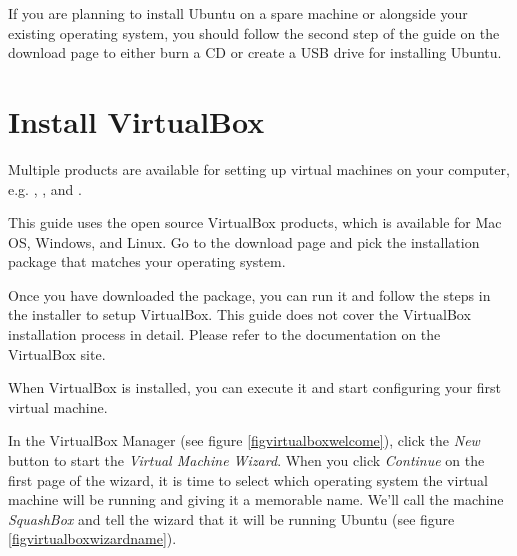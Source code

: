 \documentclass[ebook,10pt,twoside,openright]{memoir}
\begin{document}

If you are planning to install Ubuntu on a spare machine or alongside your existing operating system, you should follow the second step of the guide on the download page to either burn a CD or create a USB drive for installing Ubuntu.

\section{Install VirtualBox} \label{secinstallvirtualbox}

Multiple products are available for setting up virtual machines on your computer, e.g. , , and .

This guide uses the open source VirtualBox products, which is available for Mac OS, Windows, and Linux. Go to the download page and pick the installation package that matches your operating system.


Once you have downloaded the package, you can run it and follow the steps in the installer to setup VirtualBox. This guide does not cover the VirtualBox installation process in detail. Please refer to the documentation on the VirtualBox site.

When VirtualBox is installed, you can execute it and start configuring your first virtual machine.


In the VirtualBox Manager (see figure \ref{figvirtualboxwelcome}), click the \emph{New} button to start the \emph{Virtual Machine Wizard}. When you click \emph{Continue} on the first page of the wizard, it is time to select which operating system the virtual machine will be running and giving it a memorable name. We'll call the machine \emph{SquashBox} and tell the wizard that it will be running Ubuntu (see figure \ref{figvirtualboxwizardname}).

\end{document}
